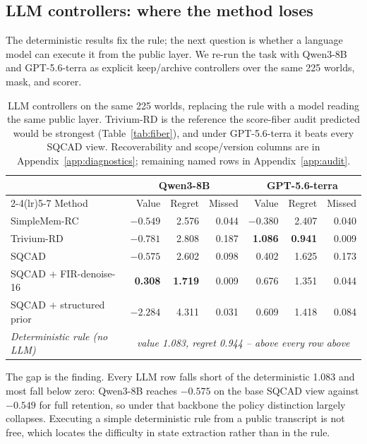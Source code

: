 \documentclass{article}
\newcommand{\SQCAD}{\textsc{SQCAD}}
\begin{document}
\subsection{LLM controllers: where the method loses}
\label{sec:lifecycle}
The deterministic results fix the rule; the next question is whether a language model
can execute it from the public layer. We re-run the task with Qwen3-8B and
GPT-5.6-terra as explicit keep/archive controllers over the same 225 worlds, mask,
and scorer.
\begin{table}[!ht]
\caption{LLM controllers on the same 225 worlds, replacing the rule with a model
reading the same public layer. Trivium-RD is the reference the score-fiber audit
predicted would be strongest (Table~\ref{tab:fiber}), and under GPT-5.6-terra it
beats every \SQCAD{} view. Recoverability and scope/version columns are in
Appendix~\ref{app:diagnostics}; remaining named rows in
Appendix~\ref{app:audit}.}
\label{tab:lifecycle_models}
\centering\small
\begin{tabular}{lrrrrrr}
\toprule
& \multicolumn{3}{c}{Qwen3-8B} & \multicolumn{3}{c}{GPT-5.6-terra} \\
\cmidrule(lr){2-4}\cmidrule(lr){5-7}
Method & Value & Regret & Missed & Value & Regret & Missed \\
\midrule
SimpleMem-RC & $-0.549$ & 2.576 & 0.044 & $-0.380$ & 2.407 & 0.040 \\
Trivium-RD & $-0.781$ & 2.808 & 0.187 & \textbf{1.086} & \textbf{0.941} & 0.009 \\
\midrule
\SQCAD{} & $-0.575$ & 2.602 & 0.098 & 0.402 & 1.625 & 0.173 \\
\SQCAD{} $+$ FIR-denoise-16 & \textbf{0.308} & \textbf{1.719} & 0.009 & 0.676 & 1.351 & 0.044 \\
\SQCAD{} $+$ structured prior & $-2.284$ & 4.311 & 0.031 & 0.609 & 1.418 & 0.084 \\
\midrule
\textit{Deterministic rule (no LLM)} & \multicolumn{6}{c}{\textit{value 1.083, regret 0.944 -- above every row above}} \\
\bottomrule
\end{tabular}
\end{table}

The gap is the finding. Every LLM row falls short of the deterministic 1.083 and
most fall below zero: Qwen3-8B reaches $-0.575$ on the base \SQCAD{} view against
$-0.549$ for full retention, so under that backbone the policy distinction largely
collapses. Executing a simple deterministic rule from a public transcript is not
free, which locates the difficulty in state extraction rather than in the rule.
\end{document}
